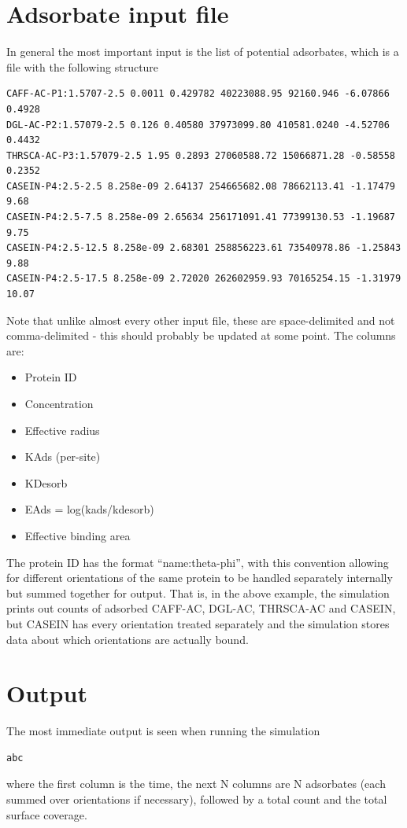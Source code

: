 \documentclass[10pt,a4paper,onecolumn]{report}
\begin{document}
\section{Adsorbate input file}
In general the most important input is the list of potential adsorbates, which is a file with the following structure
\begin{lstlisting}
CAFF-AC-P1:1.5707-2.5 0.0011 0.429782 40223088.95 92160.946 -6.07866 0.4928
DGL-AC-P2:1.57079-2.5 0.126 0.40580 37973099.80 410581.0240 -4.52706 0.4432
THRSCA-AC-P3:1.57079-2.5 1.95 0.2893 27060588.72 15066871.28 -0.58558 0.2352
CASEIN-P4:2.5-2.5 8.258e-09 2.64137 254665682.08 78662113.41 -1.17479 9.68
CASEIN-P4:2.5-7.5 8.258e-09 2.65634 256171091.41 77399130.53 -1.19687 9.75
CASEIN-P4:2.5-12.5 8.258e-09 2.68301 258856223.61 73540978.86 -1.25843 9.88
CASEIN-P4:2.5-17.5 8.258e-09 2.72020 262602959.93 70165254.15 -1.31979 10.07
\end{lstlisting}
Note that unlike almost every other input file, these are space-delimited and not comma-delimited - this should probably be updated at some point. The columns are:
\begin{itemize}
\item Protein ID
\item Concentration
\item Effective radius
\item KAds (per-site)
\item KDesorb
\item EAds = log(kads/kdesorb)
\item Effective binding area 
\end{itemize}
The protein ID has the format ``name:theta-phi'', with this convention allowing for different orientations of the same protein to be handled separately internally but summed together for output. That is, in the above example, the simulation prints out counts of adsorbed CAFF-AC, DGL-AC, THRSCA-AC and CASEIN, but CASEIN has every orientation treated separately and the simulation stores data about which orientations are actually bound. 



\section{Output}
The most immediate output is seen when running the simulation 
\begin{lstlisting}
abc
\end{lstlisting}
where the first column is the time, the next N columns are N adsorbates (each summed over orientations if necessary), followed by a total count and the total surface coverage. 
\end{document}
